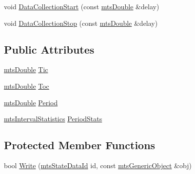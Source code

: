 {\bf }\par
\begin{DoxyCompactItemize}
\item 
void \hyperlink{classmts_state_table_ad191fb91b2286463b51939cdf5516a73}{Data\-Collection\-Start} (const \hyperlink{mts_generic_object_proxy_8h_a31e76b0190a8d3f9838626cd7b47bd75}{mts\-Double} \&delay)
\item 
void \hyperlink{classmts_state_table_ab4fbac293ae8c60cb82a6381e887f03c}{Data\-Collection\-Stop} (const \hyperlink{mts_generic_object_proxy_8h_a31e76b0190a8d3f9838626cd7b47bd75}{mts\-Double} \&delay)
\end{DoxyCompactItemize}

\subsection*{Public Attributes}
\begin{DoxyCompactItemize}
\item 
\hyperlink{mts_generic_object_proxy_8h_a31e76b0190a8d3f9838626cd7b47bd75}{mts\-Double} \hyperlink{classmts_state_table_ae4b2244609f4ec292d183d1daeeaf994}{Tic}
\item 
\hyperlink{mts_generic_object_proxy_8h_a31e76b0190a8d3f9838626cd7b47bd75}{mts\-Double} \hyperlink{classmts_state_table_a03193d2edccd43f42e65aaec7207708f}{Toc}
\item 
\hyperlink{mts_generic_object_proxy_8h_a31e76b0190a8d3f9838626cd7b47bd75}{mts\-Double} \hyperlink{classmts_state_table_a4b11db6f64680d32fa7a0fc79ee62862}{Period}
\item 
\hyperlink{classmts_interval_statistics}{mts\-Interval\-Statistics} \hyperlink{classmts_state_table_ae4914598ee6ee5a523f8ecc7008c5ceb}{Period\-Stats}
\end{DoxyCompactItemize}
\subsection*{Protected Member Functions}
\begin{DoxyCompactItemize}
\item 
bool \hyperlink{classmts_state_table_a98e00ccdd5e915cfee752d2dbf38cb31}{Write} (\hyperlink{mts_state_table_8h_ac3a0e34e8991d51790b043fa01857a35}{mts\-State\-Data\-Id} id, const \hyperlink{classmts_generic_object}{mts\-Generic\-Object} \&obj)
\end{DoxyCompactItemize}
